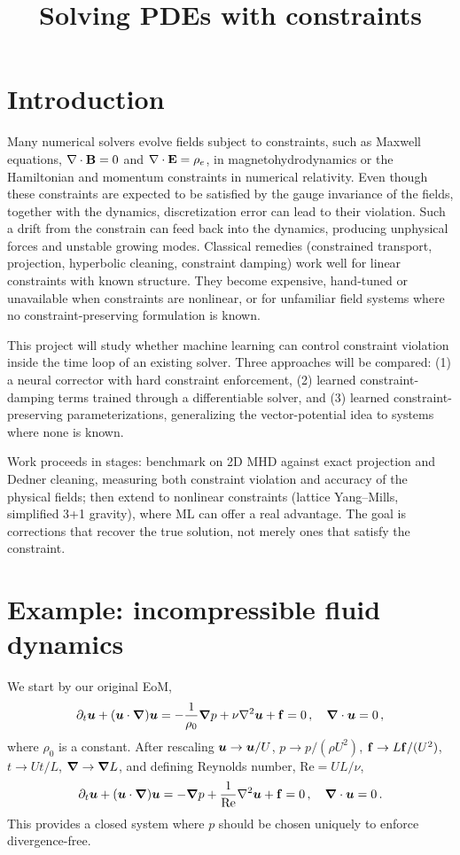 \documentclass{article}
\title{Solving PDEs with constraints}
\begin{document}
\maketitle

\section{Introduction}
Many numerical solvers evolve fields subject to constraints, such as 
Maxwell equations, $\nabla \cdot {\bf B}=0$ and $\nabla \cdot {\bf E} = \rho_e$, in magnetohydrodynamics or the Hamiltonian and momentum constraints in numerical relativity.
Even though these constraints are expected to be satisfied by the
gauge invariance of the fields, together with the dynamics,
discretization error can lead to their violation.
Such a drift from the constrain can feed back into the dynamics, producing unphysical forces and unstable growing modes. Classical remedies (constrained transport, projection, hyperbolic cleaning, constraint damping) work well for linear constraints with known structure. They become expensive, hand-tuned or unavailable when constraints are nonlinear, or for unfamiliar field systems where no constraint-preserving formulation is known.

This project will study whether machine learning can control constraint violation inside the time loop of an existing solver.
Three approaches will be compared: (1) a neural corrector with hard constraint enforcement, (2) learned constraint-damping terms trained through a differentiable solver, and (3) learned constraint-preserving parameterizations, generalizing the vector-potential idea to systems where none is known.

Work proceeds in stages: benchmark on 2D MHD against exact projection and Dedner cleaning, measuring both constraint violation and accuracy of the physical fields; then extend to nonlinear constraints (lattice Yang–Mills, simplified 3+1 gravity), where ML can offer a real advantage. The goal is corrections that recover the true solution, not merely ones that satisfy the constraint.

\section{Example: incompressible fluid dynamics}

We start by our original EoM,
\begin{equation}
    \partial_t \uu + (\uu \cdot \nab) \uu = - \frac{1}{\rho_0}
    \nab p + \nu \nabla^2 \uu + {\bf f} = 0\,,
    \quad \nab \cdot \uu = 0\,,
\end{equation}
where $\rho_0$ is a constant.
After rescaling $\uu \to \uu / U$, $p \to p / (\rho U^2)$, ${\bf f} \to L {\bf f}/(U^2)$, $t \to U t / L$, $\nab \to \nab L$,
and defining Reynolds number, Re$= UL / \nu$,
\begin{equation}
    \partial_t \uu + (\uu \cdot \nab) \uu = - 
    \nab p + \frac{1}{{\rm Re}} \nabla^2 \uu + {\bf f} = 0\,,
    \quad \nab \cdot \uu = 0\,.
\end{equation}
This provides a closed system where $p$ should be chosen
uniquely to enforce divergence-free.
\end{document}
